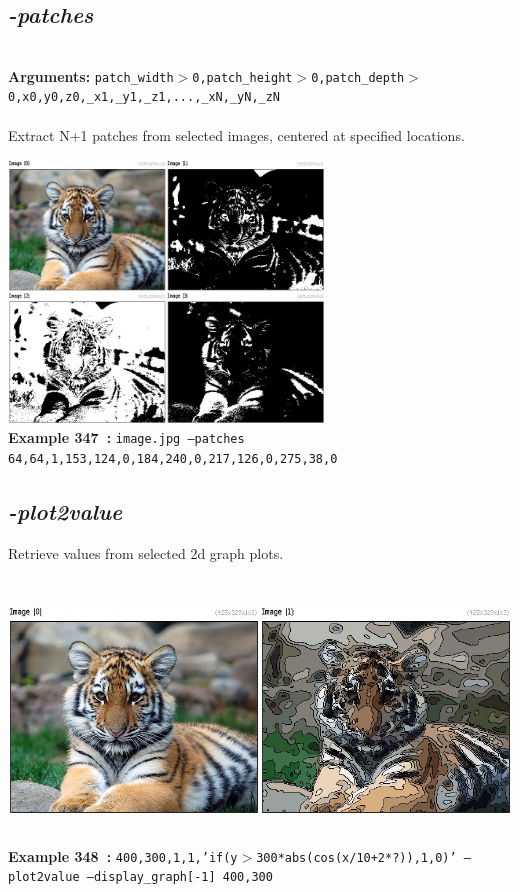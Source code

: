 \documentclass[a4paper,11pt,twoside]{book}
\begin{document}
\subsection{\emph{-patches} }\vspace*{-0.5em}
~\\\textbf{Arguments: } 
{\small \texttt{patch\_width$>$0,patch\_height$>$0,patch\_depth$>$0,x0,y0,z0,\_x1,\_y1,\_z1,...,\_xN,\_yN,\_zN}}\\~\\
Extract N+1 patches from selected images, centered at specified locations.
\begin{center}\includegraphics[keepaspectratio=true,height=7cm,width=\textwidth]{img/gmic_def347.jpg}\\
{\footnotesize \textbf{Example 347~:} \texttt{image.jpg --patches 64,64,1,153,124,0,184,240,0,217,126,0,275,38,0}}
\end{center}

\subsection{\emph{-plot2value} }\vspace*{-0.5em}
Retrieve values from selected 2d graph plots.
\begin{center}\includegraphics[keepaspectratio=true,height=7cm,width=\textwidth]{img/gmic_def348.jpg}\\
{\footnotesize \textbf{Example 348~:} \texttt{400,300,1,1,'if(y$>$300*abs(cos(x/10+2*?)),1,0)' --plot2value --display\_graph[-1] 400,300}}
\end{center}
\end{document}
